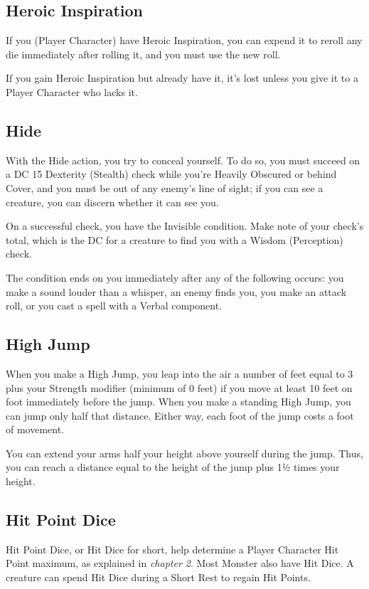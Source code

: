 \documentclass[10pt,a4paper,twoside,bg=print,twocolumn,openany,nodeprecatedcode]{dndarticle}
\begin{document}
\subsection{Heroic Inspiration}
If you (Player Character) have Heroic Inspiration, you can expend it to reroll any die immediately after rolling it, and you must use the new roll.

If you gain Heroic Inspiration but already have it, it's lost unless you give it to a Player Character who lacks it.

\subsection{Hide}
With the Hide action, you try to conceal yourself. To do so, you must succeed on a DC 15 Dexterity (Stealth) check while you're Heavily Obscured or behind Cover, and you must be out of any enemy's line of sight; if you can see a creature, you can discern whether it can see you.

On a successful check, you have the Invisible condition. Make note of your check's total, which is the DC for a creature to find you with a Wisdom (Perception) check.

The condition ends on you immediately after any of the following occurs: you make a sound louder than a whisper, an enemy finds you, you make an attack roll, or you cast a spell with a Verbal component.

\subsection{High Jump}
When you make a High Jump, you leap into the air a number of feet equal to 3 plus your Strength modifier (minimum of 0 feet) if you move at least 10 feet on foot immediately before the jump. When you make a standing High Jump, you can jump only half that distance. Either way, each foot of the jump costs a foot of movement.

You can extend your arms half your height above yourself during the jump. Thus, you can reach a distance equal to the height of the jump plus 1½ times your height.

\subsection{Hit Point Dice}
Hit Point Dice, or Hit Dice for short, help determine a Player Character Hit Point maximum, as explained in \textit{chapter 2}. Most Monster also have Hit Dice. A creature can spend Hit Dice during a Short Rest to regain Hit Points.
\end{document}
